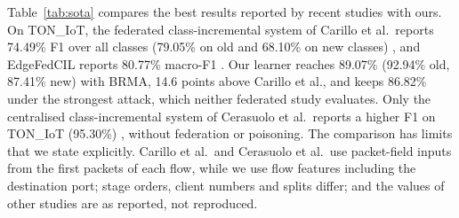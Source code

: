 \documentclass[pdflatex,sn-mathphys-num]{sn-jnl}
\theoremstyle{thmstyleone}
\theoremstyle{thmstylethree}
\begin{document}
Table~\ref{tab:sota} compares the best results reported by recent studies with ours. On TON\_IoT, the federated class-incremental system of Carillo et al.\ reports 74.49\% F1 over all classes (79.05\% on old and 68.10\% on new classes) \cite{carillo}, and EdgeFedCIL reports 80.77\% macro-F1 \cite{wu}. Our learner reaches 89.07\% (92.94\% old, 87.41\% new) with BRMA, 14.6 points above Carillo et al., and keeps 86.82\% under the strongest attack, which neither federated study evaluates. Only the centralised class-incremental system of Cerasuolo et al.\ reports a higher F1 on TON\_IoT (95.30\%) \cite{cerasuolo}, without federation or poisoning. The comparison has limits that we state explicitly. Carillo et al.\ and Cerasuolo et al.\ use packet-field inputs from the first packets of each flow, while we use flow features including the destination port; stage orders, client numbers and splits differ; and the values of other studies are as reported, not reproduced.
\end{document}
